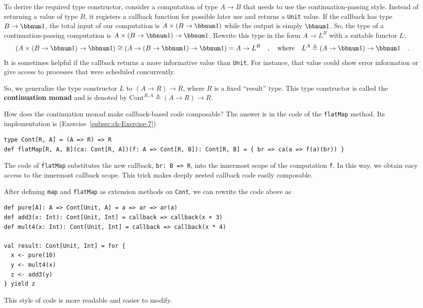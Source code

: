 To derive the required type constructor, consider a computation of
type $A\rightarrow B$ that needs to use the continuation-passing
style. Instead of returning a value of type $B$, it registers a callback
function for possible later use and returns a \lstinline!Unit! value.
If the callback has type $B\rightarrow\bbnum 1$, the total input
of our computation is $A\times\left(B\rightarrow\bbnum 1\right)$
while the output is simply $\bbnum 1$. So, the type of a continuation-passing
computation is $A\times\left(B\rightarrow\bbnum 1\right)\rightarrow\bbnum 1$.
Rewrite this type in the form $A\rightarrow L^{B}$ with a suitable
functor $L$:
\[
\left(A\times\left(B\rightarrow\bbnum 1\right)\rightarrow\bbnum 1\right)\cong\left(A\rightarrow\left(B\rightarrow\bbnum 1\right)\rightarrow\bbnum 1\right)=A\rightarrow L^{B}\quad,\quad\text{where}\quad L^{A}\triangleq\left(A\rightarrow\bbnum 1\right)\rightarrow\bbnum 1\quad.
\]
It is sometimes helpful if the callback returns a more informative
value than \lstinline!Unit!. For instance, that value could show
error information or give access to processes that were scheduled
concurrently.

So, we generalize the type constructor $L$ to $\left(A\rightarrow R\right)\rightarrow R$,
where $R$ is a fixed \textsf{``}result\textsf{''} type. This type constructor is
called the \textbf{continuation monad} and is denoted by $\text{Cont}^{R,A}\triangleq\left(A\rightarrow R\right)\rightarrow R$.

How does the continuation monad make callback-based code composable?
The answer is in the code of the \lstinline!flatMap! method. Its
implementation is (Exercise~\ref{subsec:ch-Exercise-7})
\begin{lstlisting}
type Cont[R, A] = (A => R) => R
def flatMap[R, A, B](ca: Cont[R, A])(f: A => Cont[R, B]): Cont[R, B] = { br => ca(a => f(a)(br)) }
\end{lstlisting}
The code of \lstinline!flatMap! substitutes the new callback, \lstinline!br: B => R!,
into the innermost scope of the computation \lstinline!f!. In this
way, we obtain easy access to the innermost callback scope. This trick
makes deeply nested callback code easily composable.

After defining \lstinline!map! and \lstinline!flatMap! as extension
methods on \lstinline!Cont!, we can rewrite the code above as
\begin{lstlisting}
def pure[A]: A => Cont[Unit, A] = a => ar => ar(a)
def add3(x: Int): Cont[Unit, Int] = callback => callback(x + 3)
def mult4(x: Int): Cont[Unit, Int] = callback => callback(x * 4)

val result: Cont[Unit, Int] = for {
  x <- pure(10)
  y <- mult4(x)
  z <- add3(y)
} yield z
\end{lstlisting}
This style of code is more readable and easier to modify.

